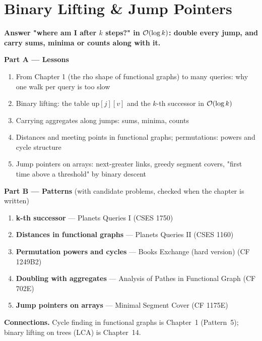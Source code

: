 \chapter{Binary Lifting \& Jump Pointers}
\label{ch:binary_lifting}

\begin{tcolorbox}[enhanced, colback=white, colframe=secondaryblue, boxrule=1pt, arc=2mm]
\textbf{\large\textcolor{primaryblue}{Answer "where am I after $k$ steps?" in $\mathcal{O}(\log k)$: double every jump, and carry sums, minima or counts along with it.}}
\end{tcolorbox}


\begin{plannedbox}
\textbf{Part A --- Lessons}
\begin{enumerate}[leftmargin=*, label=\textbf{A\arabic*.}, itemsep=1pt]
    \item From Chapter 1 (the rho shape of functional graphs) to many queries: why one walk per query is too slow
    \item Binary lifting: the table $\mathrm{up}[j][v]$ and the $k$-th successor in $\mathcal{O}(\log k)$
    \item Carrying aggregates along jumps: sums, minima, counts
    \item Distances and meeting points in functional graphs; permutations: powers and cycle structure
    \item Jump pointers on arrays: next-greater links, greedy segment covers, "first time above a threshold" by binary descent
\end{enumerate}
\textbf{Part B --- Patterns} (with candidate problems, checked when the chapter is written)
\begin{enumerate}[leftmargin=*, label=\textbf{P\arabic*.}, itemsep=1pt]
    \item \textbf{k-th successor} --- Planets Queries I {\small\color{darkgray}(CSES 1750)}
    \item \textbf{Distances in functional graphs} --- Planets Queries II {\small\color{darkgray}(CSES 1160)}
    \item \textbf{Permutation powers and cycles} --- Books Exchange (hard version) {\small\color{darkgray}(CF 1249B2)}
    \item \textbf{Doubling with aggregates} --- Analysis of Pathes in Functional Graph {\small\color{darkgray}(CF 702E)}
    \item \textbf{Jump pointers on arrays} --- Minimal Segment Cover {\small\color{darkgray}(CF 1175E)}
\end{enumerate}
\textbf{Connections.} Cycle finding in functional graphs is Chapter~1 (Pattern~5); binary lifting on trees (LCA) is Chapter~14.
\end{plannedbox}
